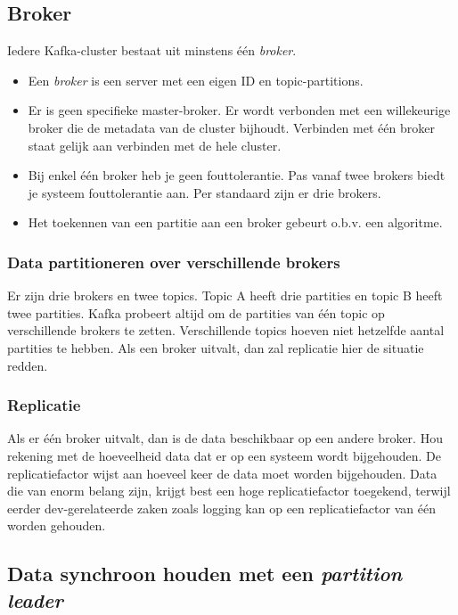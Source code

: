 \documentclass[a4paper,10pt,twoside]{report}
\begin{document}
\subsection{Broker}

Iedere Kafka-cluster bestaat uit minstens één \textit{broker}.  

\begin{itemize}
	\item Een \textit{broker} is een server met een eigen ID en topic-partitions.
	\item Er is geen specifieke master-broker. Er wordt verbonden met een willekeurige broker die de metadata van de cluster bijhoudt. Verbinden met één broker staat gelijk aan verbinden met de hele cluster.
	\item Bij enkel één broker heb je geen fouttolerantie. Pas vanaf twee brokers biedt je systeem fouttolerantie aan. Per standaard zijn er drie brokers.
	\item Het toekennen van een partitie aan een broker gebeurt o.b.v. een algoritme.
\end{itemize}

\subsubsection{Data partitioneren over verschillende brokers}

Er zijn drie brokers en twee topics. Topic A heeft drie partities en topic B heeft twee partities. Kafka probeert altijd om de partities van één topic op verschillende brokers te zetten. Verschillende topics hoeven niet hetzelfde aantal partities te hebben. Als een broker uitvalt, dan zal replicatie hier de situatie redden. 

\subsubsection{Replicatie}

Als er één broker uitvalt, dan is de data beschikbaar op een andere broker. Hou rekening met de hoeveelheid data dat er op een systeem wordt bijgehouden. De replicatiefactor wijst aan hoeveel keer de data moet worden bijgehouden. Data die van enorm belang zijn, krijgt best een hoge replicatiefactor toegekend, terwijl eerder dev-gerelateerde zaken zoals logging kan op een replicatiefactor van één worden gehouden.

\subsection{Data synchroon houden met een \textit{partition leader}}
\end{document}
